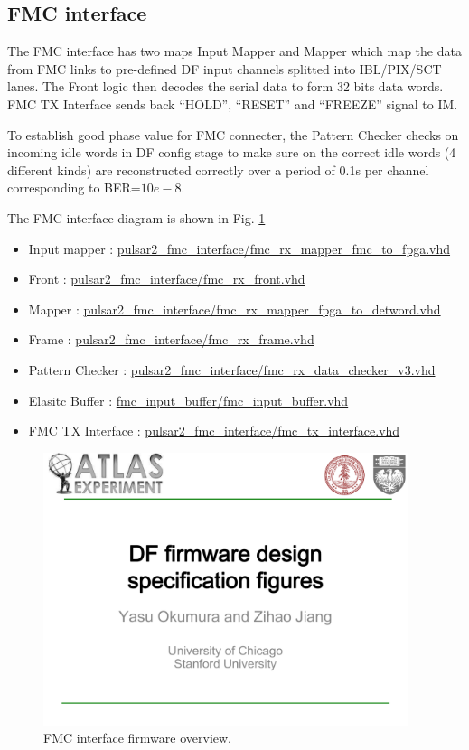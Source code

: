 \documentclass[11pt,letterpaper]{article}
\begin{document}
\subsection{FMC interface}

The FMC interface has two maps Input Mapper and Mapper which map the data from FMC links to pre-defined DF input channels splitted into IBL/PIX/SCT lanes. The Front logic then decodes the serial data to form 32 bits data words. FMC TX Interface sends back ``HOLD'', ``RESET'' and ``FREEZE'' signal to IM. 

To establish good phase value for FMC connecter, the Pattern Checker checks on incoming idle words in DF config stage to make sure on the correct idle words (4 different kinds) are reconstructed correctly over a period of 0.1s per channel corresponding to BER=$10e-8$. 

The FMC interface diagram is shown in Fig. \ref{fig:FMC_INTERFACE_OVERVIEW}

\begin{itemize}
\item Input mapper : \url{pulsar2_fmc_interface/fmc_rx_mapper_fmc_to_fpga.vhd}
\item Front : \url{pulsar2_fmc_interface/fmc_rx_front.vhd}
\item Mapper : \url{pulsar2_fmc_interface/fmc_rx_mapper_fpga_to_detword.vhd}
\item Frame : \url{pulsar2_fmc_interface/fmc_rx_frame.vhd}
\item Pattern Checker : \url{pulsar2_fmc_interface/fmc_rx_data_checker_v3.vhd}
\item Elasitc Buffer : \url{fmc_input_buffer/fmc_input_buffer.vhd}
\item FMC TX Interface : \url{pulsar2_fmc_interface/fmc_tx_interface.vhd}
\end{itemize}

\begin{figure}[h!]
  \centering
  \includegraphics[width=0.95\textwidth,clip,page=5]{figures.pdf}
  \caption{FMC interface firmware overview.}
  \label{fig:FMC_INTERFACE_OVERVIEW}
\end{figure}
\end{document}
